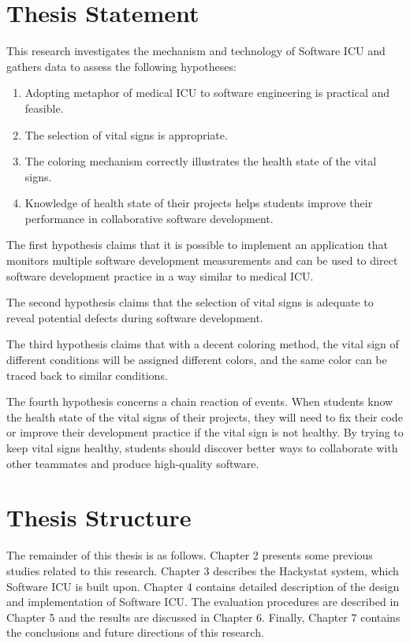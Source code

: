 \section{Thesis Statement}
This research investigates the mechanism and technology of Software ICU and gathers data to assess the following hypotheses: 
\begin{enumerate}
\item Adopting metaphor of medical ICU to software engineering is practical and feasible.
\item The selection of vital signs is appropriate.
\item The coloring mechanism correctly illustrates the health state of the vital signs.
\item Knowledge of health state of their projects helps students improve their performance in collaborative software development.
\end{enumerate}
The first hypothesis claims that it is possible to implement an application that monitors multiple software development measurements and can be used to direct software development practice in a way similar to medical ICU.

The second hypothesis claims that the selection of vital signs is adequate to reveal potential defects during software development.

The third hypothesis claims that with a decent coloring method, the vital sign of different conditions will be assigned different colors, and the same color can be traced back to similar conditions.

The fourth hypothesis concerns a chain reaction of events. When students know the health state of the vital signs of their projects, they will need to fix their code or improve their development practice if the vital sign is not healthy. By trying to keep vital signs healthy, students should discover better ways to collaborate with other teammates and produce high-quality software.

\section{Thesis Structure}
The remainder of this thesis is as follows. Chapter 2 presents some previous studies related to this research. Chapter 3 describes the Hackystat system, which Software ICU is built upon. Chapter 4 contains detailed description of the design and implementation of Software ICU. The evaluation procedures are described in Chapter 5 and the results are discussed in Chapter 6. Finally, Chapter 7 contains the conclusions and future directions of this research. 



